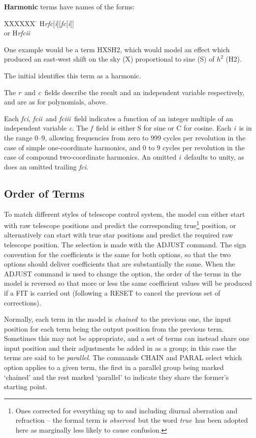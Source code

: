 {\bf Harmonic} terms have names of the forms:
\begin{tabs}
XXXXXX \= \kill
\> H{\it rfc}[{\it i}][{\it fc}[{\it i}]] \\
or \> H{\it rfcii}
\end{tabs}
One example would be a term HXSH2, which would model an effect
which produced an east-west shift on the sky (X) proportional
to sine (S) of $h^2$ (H2).

The initial  identifies this term as a harmonic.

The {\it r}\, and {\it c}\, fields describe the result and an independent
variable respectively, and are as for polynomials, above.

Each {\it fci}, {\it fcii}\, and {\it fciii}\, field indicates a function
of an integer multiple of an independent variable {\it c}.
The {\it f}\, field is either S for sine or C for cosine.
Each {\it i}\, is in the range 0--9,
allowing frequencies from zero to 999 cycles per revolution in the
case of simple one-coordinate harmonics, and 0 to 9 cycles per revolution
in the case of compound two-coordinate harmonics.
An omitted {\it i}\, defaults to unity, as does an
omitted trailing {\it fci}.

\subsection{Order of Terms}
To match different styles of telescope control system,
the model can either start with raw telescope positions and
predict the corresponding true\footnote{Ones corrected for everything
up to and including diurnal aberration and refraction -- the
formal term is {\it observed}\, but the word {\it true}\, has been
adopted here as marginally less
likely to cause confusion.} position, or alternatively can
start with true star positions and predict the required
raw telescope position.  The selection is made with the
ADJUST command.  The sign convention for the coefficients is
the same for both options, so that the two options should
deliver coefficients that are substantially the same.  When
the ADJUST command is used to change the option, the order
of the terms in the model is reversed so that more or less
the same coefficient values will be produced if a FIT is
carried out (following a RESET to cancel the previous set
of corrections).

Normally, each term in the model is {\it chained}\, to the previous
one, the input position for each term being the output position
from the previous term.  Sometimes this may not be appropriate,
and a set of terms can instead share one input position and
their adjustments be added in as a group;  in this case the
terms are said to be {\it parallel}.  The commands CHAIN and PARAL
select which option applies to a given term, the first in a
parallel group being marked `chained' and the rest marked
`parallel' to indicate they share the former's starting
point.

